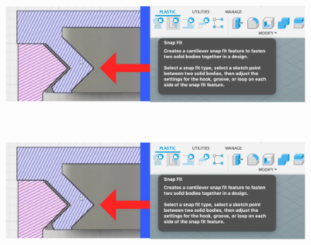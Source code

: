 \begin{figure}[!htb]
    \begin{minipage}{0.41\textwidth}
        \includegraphics[height=5cm]{assets/images/hardware/cad-snapfit.png}
        \caption{}
        \label{fig:cad-snap-fit-1}
    \end{minipage}
    \hspace{0.1\textwidth} %
    \begin{minipage}{0.41\textwidth}
        \includegraphics[height=5cm]{assets/images/hardware/cad-snapfit.png}
        \caption{}
        \label{fig:cad-snap-fit-2}
    \end{minipage}
\end{figure}

